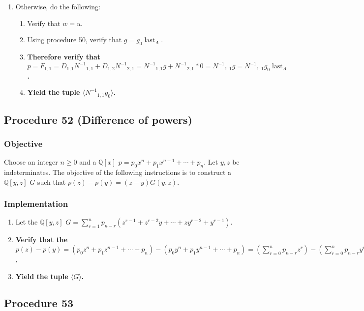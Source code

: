\documentclass[twocolumn]{article}
\DeclareMathOperator{\last}{last}
\begin{document}
\begin{enumerate}
					\item Otherwise, do the following:
					\begin{enumerate}
						\item Verify that $w=u$.
						\item Using \hyperref[sec:procedure 50]{procedure 50}, verify that $g=g_0\last_A$.
						\item \textbf{Therefore verify that $p=F_{1,1}=D_{1,1}{N^{-1}}_{1,1}+D_{1,2}{N^{-1}}_{2,1}={N^{-1}}_{1,1}g+{N^{-1}}_{2,1}*0={N^{-1}}_{1,1}g={N^{-1}}_{1,1}g_0\last_A$.}
						\item \textbf{Yield the tuple $\langle {N^{-1}}_{1,1}g_0\rangle$.}
					\end{enumerate}
				\end{enumerate}
		\subsection{Procedure 52 (Difference of powers)}\label{sec:procedure 52}
			\subsubsection{Objective}
				Choose an integer $n\ge 0$ and a $\mathbb{Q}[x]$ $p=p_0x^n+p_1x^{n-1}+\cdots+p_n$. Let $y,z$ be indeterminates. The objective of the following instructions is to construct a $\mathbb{Q}[y,z]$ $G$ such that $p(z)-p(y)=(z-y)G(y,z)$.
			\subsubsection{Implementation}
				\begin{enumerate}
					\item Let the $\mathbb{Q}[y,z]$ $G=\sum_{r=1}^n p_{n-r}(z^{r-1}+z^{r-2}y+\cdots+zy^{r-2}+y^{r-1})$.
					\item \textbf{Verify that the $p(z)-p(y)=(p_0z^n+p_1z^{n-1}+\cdots+p_n)-(p_0y^n+p_1y^{n-1}+\cdots+p_n)=(\sum_{r=0}^n p_{n-r}z^r)-(\sum_{r=0}^n p_{n-r}y^r)=\sum_{r=1}^n p_{n-r}(z^r-y^r)=\sum_{r=1}^n p_{n-r}(z-y)(z^{r-1}+z^{r-2}y+\cdots+zy^{r-2}+y^{r-1})=(z-y)\sum_{r=1}^n p_{n-r}(z^{r-1}+z^{r-2}y+\cdots+zy^{r-2}+y^{r-1})=(z-y)G(y,z)$.}
					\item \textbf{Yield the tuple $\langle G\rangle$.}
				\end{enumerate}
		\subsection{Procedure 53}\label{sec:procedure 53}
\end{document}

